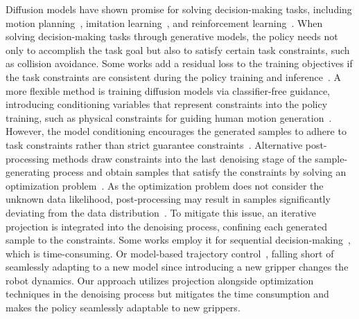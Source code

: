 Diffusion models have shown promise for solving decision-making tasks, including motion planning~\cite{10342382,mizuta2024cobl}, imitation learning~\cite{chi2023diffusion,Ze2024DP3,reuss2023goal}, and reinforcement learning~\cite{liang2023adaptdiffuser,venkatraman2024reasoning}. When solving decision-making tasks through generative models, the policy needs not only to accomplish the task goal but also to satisfy certain task constraints, such as collision avoidance. Some works add a residual loss to the training objectives if the task constraints are consistent during the policy training and inference~\cite{mizuta2024cobl,bastek2024physics}. A more flexible method is training diffusion models via classifier-free guidance\cite{ho2022classifier}, introducing conditioning variables that represent constraints into the policy training, such as physical constraints for guiding human motion generation~\cite{yuan2023physdiff}. However, the model conditioning encourages the generated samples to adhere to task constraints rather than strict guarantee constraints~\cite{christopher2024constrained}. Alternative post-processing methods draw constraints into the last denoising stage of the sample-generating process and obtain samples that satisfy the constraints by solving an optimization problem~\cite{maze2023diffusion,giannone2023aligning}. As the optimization problem does not consider the unknown data likelihood, post-processing may result in samples significantly deviating from the data distribution~\cite{romer2024diffusion}. To mitigate this issue, an iterative projection is integrated into the denoising process, confining each generated sample to the constraints. Some works employ it for sequential decision-making~\cite{christopher2024constrained}, which is time-consuming. Or model-based trajectory control~\cite{romer2024diffusion}, falling short of seamlessly adapting to a new model since introducing a new gripper changes the robot dynamics. Our approach utilizes projection alongside optimization techniques in the denoising process but mitigates the time consumption and makes the policy seamlessly adaptable to new grippers.